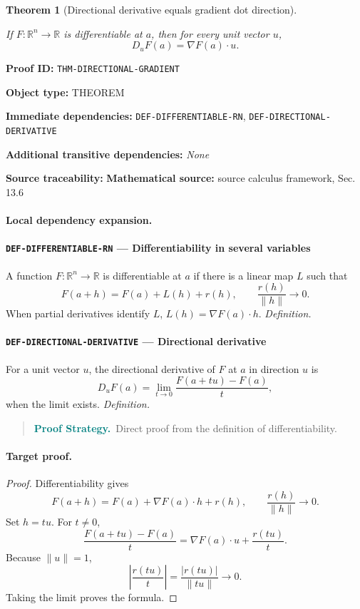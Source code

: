 \documentclass[10pt]{article}
\newcommand{\pidraw}[1]{\begingroup\urlstyle{tt}\nolinkurl{#1}\endgroup}
\newtheorem{theorem}{Theorem}[section]
\theoremstyle{definition}
\theoremstyle{remark}
\newenvironment{proofstrategy}
{\begin{quote}\small\noindent\textbf{\textcolor{teal}{Proof Strategy.}}\ }
{\end{quote}}
\newcommand{\meta}[2]{\noindent\textbf{#1:} #2\par}
\begin{document}
\begin{theorem}[Directional derivative equals gradient dot direction]\label{prf:THM-DIRECTIONAL-GRADIENT}

If $F:\mathbb{R}^n\to\mathbb{R}$ is differentiable at $a$, then for every unit vector $u$,
\[
D_uF(a)=\nabla F(a)\cdot u.
\]

\end{theorem}

\meta{Proof ID}{\pidraw{THM-DIRECTIONAL-GRADIENT}}
\meta{Object type}{THEOREM}
\meta{Immediate dependencies}{\pidraw{DEF-DIFFERENTIABLE-RN}, \pidraw{DEF-DIRECTIONAL-DERIVATIVE}}
\meta{Additional transitive dependencies}{\emph{None}}
\meta{Source traceability}{\textbf{Mathematical source:} source calculus framework, Sec. 13.6}

\paragraph{Local dependency expansion.}

\paragraph{\pidraw{DEF-DIFFERENTIABLE-RN} --- Differentiability in several variables}
A function $F:\mathbb{R}^n\to\mathbb{R}$ is differentiable at $a$ if there is a linear map $L$ such that
\[
F(a+h)=F(a)+L(h)+r(h),\qquad \frac{r(h)}{\|h\|}\to0.
\]
When partial derivatives identify $L$, $L(h)=\nabla F(a)\cdot h$.
\textit{Definition.}

\paragraph{\pidraw{DEF-DIRECTIONAL-DERIVATIVE} --- Directional derivative}
For a unit vector $u$, the directional derivative of $F$ at $a$ in direction $u$ is
\[
D_uF(a)=\lim_{t\to0}\frac{F(a+tu)-F(a)}{t},
\]
when the limit exists.
\textit{Definition.}

\begin{proofstrategy}Direct proof from the definition of differentiability.\end{proofstrategy}

\paragraph{Target proof.}

\begin{proof}

Differentiability gives
\[
F(a+h)=F(a)+\nabla F(a)\cdot h+r(h),
\qquad
\frac{r(h)}{\|h\|}\to0.
\]
Set $h=tu$. For $t\ne0$,
\[
\frac{F(a+tu)-F(a)}{t}
=
\nabla F(a)\cdot u+\frac{r(tu)}{t}.
\]
Because $\|u\|=1$,
\[
\left|\frac{r(tu)}{t}\right|
=
\frac{|r(tu)|}{\|tu\|}\to0.
\]
Taking the limit proves the formula.

\end{proof}
\end{document}
